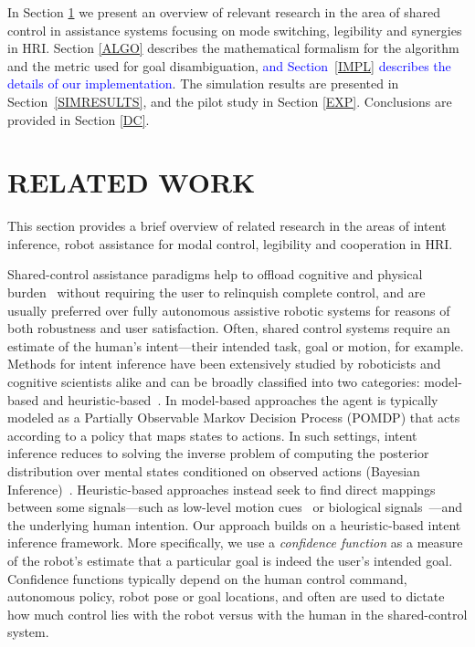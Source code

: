 \documentclass[conference]{IEEEtran}
\begin{document}
In Section \ref{RW} we present an overview of relevant research in the area of shared control in assistance systems focusing on mode switching, legibility and synergies in HRI. Section \ref{ALGO} describes the mathematical formalism for the algorithm and the metric used for goal disambiguation, \textcolor{blue}{and Section~\ref{IMPL} describes the details of our implementation}. The simulation results are presented in Section~\ref{SIMRESULTS}, and the pilot study in Section \ref{EXP}. Conclusions are provided in Section \ref{DC}.

\section{RELATED WORK}\label{RW} 

This section provides a brief overview of related research in the areas of intent inference, robot assistance for modal control, legibility and cooperation in HRI.

Shared-control assistance paradigms help to offload cognitive and physical burden~\cite{volosyak2005rehabilitation} without requiring the user to relinquish complete control, and are usually preferred over fully autonomous assistive robotic systems for reasons of both robustness and user satisfaction. Often, shared control systems require an estimate of the human's intent---their intended task, goal or motion, for example. Methods for intent inference have been extensively studied by roboticists and cognitive scientists alike and can be broadly classified into two categories: model-based and heuristic-based~\cite{baker2017rational}. In model-based approaches the agent is typically modeled as a Partially Observable Markov Decision Process (POMDP) that acts according to a policy that maps states to actions. In such settings, intent inference reduces to solving the inverse problem of computing the posterior distribution over mental states conditioned on observed actions (Bayesian Inference)~\cite{baker2007goal,baker2009action}. Heuristic-based approaches instead seek to find direct mappings between some signals---such as low-level motion cues~\cite{barrett2005accurate} or biological signals~\cite{donoghue2002connecting}---and the underlying human intention. Our approach builds on a heuristic-based intent inference framework. More specifically, we use a \textit{confidence function} as a measure of the robot's estimate that a particular goal is indeed the user's intended goal. Confidence functions typically depend on the human control command, autonomous policy, robot pose or goal locations, and often are used to dictate how much control lies with the robot versus with the human in the shared-control system. 
\end{document}
